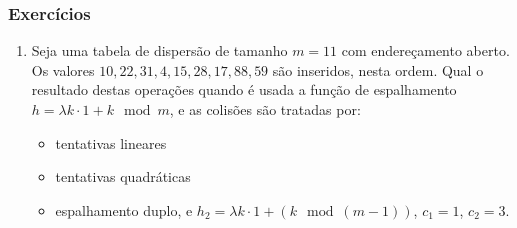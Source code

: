 \documentclass{beamer}
\begin{document}

\begin{frame}

\frametitle{Exercícios}

\begin{enumerate}

\item Seja uma tabela de dispersão de tamanho $m = 11$ com endereçamento
  aberto. Os valores $10, 22, 31, 4, 15, 28, 17, 88, 59$ são inseridos, nesta
  ordem.  Qual o resultado destas operações quando é usada a função de
  espalhamento $h = \lambda k \cdot 1 + k \mod m$, e as colisões são tratadas
  por:
\begin{itemize}
\item tentativas lineares
\item tentativas quadráticas
\item espalhamento duplo, e $h_2 = \lambda k \cdot 1 + (k \mod (m - 1))$,
  $c_1 = 1$, $c_2 = 3$.
\end{itemize}

\end{enumerate}

\end{frame}
\end{document}
